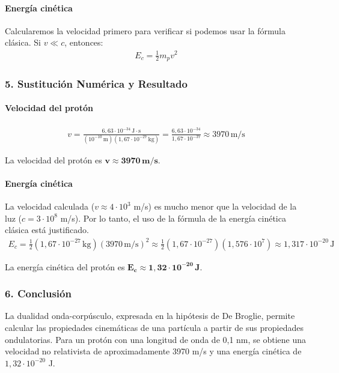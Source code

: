 \paragraph{Energía cinética}
Calcularemos la velocidad primero para verificar si podemos usar la fórmula clásica. Si $v \ll c$, entonces:
\begin{gather}
    E_c = \frac{1}{2}m_p v^2
\end{gather}

\subsubsection*{5. Sustitución Numérica y Resultado}
\paragraph{Velocidad del protón}
\begin{gather}
    v = \frac{6,63 \cdot 10^{-34}\,\text{J}\cdot\text{s}}{(10^{-10}\,\text{m}) (1,67 \cdot 10^{-27}\,\text{kg})} = \frac{6,63 \cdot 10^{-34}}{1,67 \cdot 10^{-37}} \approx 3970 \, \text{m/s}
\end{gather}
\begin{cajaresultado}
La velocidad del protón es $\boldsymbol{v \approx 3970 \, \textbf{m/s}}$.
\end{cajaresultado}

\paragraph{Energía cinética}
La velocidad calculada ($v \approx 4 \cdot 10^3$ m/s) es mucho menor que la velocidad de la luz ($c = 3 \cdot 10^8$ m/s). Por lo tanto, el uso de la fórmula de la energía cinética clásica está justificado.
\begin{gather}
    E_c = \frac{1}{2}(1,67 \cdot 10^{-27}\,\text{kg}) (3970 \, \text{m/s})^2 \approx \frac{1}{2}(1,67 \cdot 10^{-27})(1,576 \cdot 10^7) \approx 1,317 \cdot 10^{-20} \, \text{J}
\end{gather}
\begin{cajaresultado}
La energía cinética del protón es $\boldsymbol{E_c \approx 1,32 \cdot 10^{-20} \, \textbf{J}}$.
\end{cajaresultado}

\subsubsection*{6. Conclusión}
\begin{cajaconclusion}
La dualidad onda-corpúsculo, expresada en la hipótesis de De Broglie, permite calcular las propiedades cinemáticas de una partícula a partir de sus propiedades ondulatorias. Para un protón con una longitud de onda de 0,1 nm, se obtiene una velocidad no relativista de aproximadamente 3970 m/s y una energía cinética de $1,32 \cdot 10^{-20}$ J.
\end{cajaconclusion}

